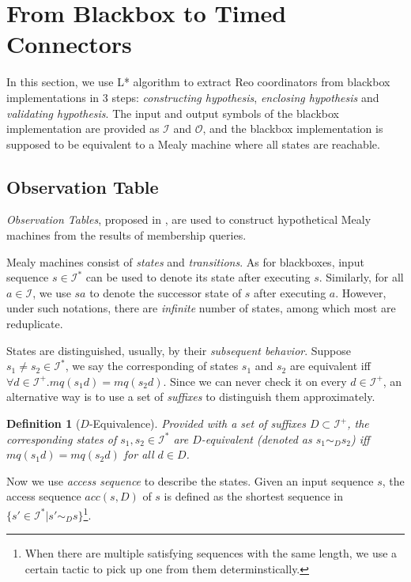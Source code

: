 \documentclass[conference, a4paper]{IEEEtran}
\newtheorem{definition}{Definition}
\begin{document}
\section{From Blackbox to Timed Connectors} 
\label{sec:activelearning}
In this section, we use L* algorithm to extract Reo coordinators from blackbox
implementations in 3 steps:
\emph{constructing hypothesis}, \emph{enclosing hypothesis} and \emph{validating hypothesis}. 
The input and output symbols of the blackbox implementation are provided as $\mathcal{I}$ and
$\mathcal{O}$, and the blackbox implementation is supposed to be equivalent to a Mealy machine where
all states are reachable.

\subsection{Observation Table}
\emph{Observation Tables}, proposed in \cite{DBLP:journals/iandc/Angluin87}, are used to construct
hypothetical Mealy machines from the results of membership queries.

Mealy machines consist of \emph{states} and \emph{transitions}.
As for blackboxes, input sequence $s\in\mathcal{I}^*$ can be used to denote its state 
after executing $s$. Similarly, for all $a\in\mathcal{I}$, we use $sa$ to denote the successor
state of $s$ after executing $a$.
However, under such notations, there are \emph{infinite} number of states, among which most are
reduplicate.

States are distinguished, usually, by their \emph{subsequent behavior}. Suppose $s_1\neq s_2\in
\mathcal{I}^*$, we say the corresponding of states $s_1$ and $s_2$ are equivalent iff $\forall d\in
\mathcal{I}^+. mq(s_1d)=mq(s_2d)$. Since we can never check it on every $d\in\mathcal{I}^+$, an
alternative way is to use a set of \emph{suffixes} to distinguish them approximately.
\begin{definition}[$D$-Equivalence]
  Provided with a set of suffixes $D\subset\mathcal{I}^+$, the corresponding states of
  $s_1,s_2\in\mathcal{I}^*$ are $D$-equivalent (denoted as $s_1\sim_D s_2$)
  iff $mq(s_1d) = mq(s_2d)$ for all $d\in D$.
\end{definition}

Now we use \emph{access sequence} to describe the states. Given an input sequence $s$, the access
sequence $acc(s,D)$ of $s$ is defined as the shortest sequence in $\{s'\in\mathcal{I}^*|s'\sim_D
s\}$\footnote{When there are multiple satisfying sequences with the same length, we use a certain tactic
to pick up one from them determinstically.}.
\end{document}
